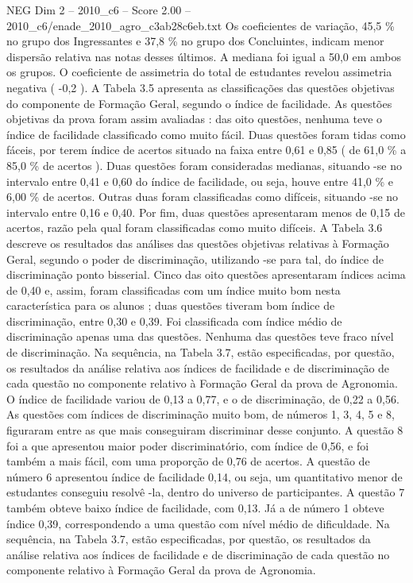 \begin{textsample}{NEG Dim 2 – 2010\_c6 – Score 2.00 – 2010\_c6/enade\_2010\_agro\_c3ab28c6eb.txt}
Os coeficientes de variação, 45,5 \% no grupo dos Ingressantes e 37,8 \% no grupo dos Concluintes, indicam menor dispersão relativa nas notas desses últimos.
A mediana foi igual a 50,0 em ambos os grupos.
O coeficiente de assimetria do total de estudantes revelou assimetria negativa ( -0,2 ).
A Tabela 3.5 apresenta as classificações das questões objetivas do componente de Formação Geral, segundo o índice de facilidade.
As questões objetivas da prova foram assim avaliadas : das oito questões, nenhuma teve o índice de facilidade classificado como muito fácil.
Duas questões foram tidas como fáceis, por terem índice de acertos situado na faixa entre 0,61 e 0,85 ( de 61,0 \% a 85,0 \% de acertos ).
Duas questões foram consideradas medianas, situando -se no intervalo entre 0,41 e 0,60 do índice de facilidade, ou seja, houve entre 41,0 \% e 6,00 \% de acertos.
Outras duas foram classificadas como difíceis, situando -se no intervalo entre 0,16 e 0,40.
Por fim, duas questões apresentaram menos de 0,15 de acertos, razão pela qual foram classificadas como muito difíceis.
A Tabela 3.6 descreve os resultados das análises das questões objetivas relativas à Formação Geral, segundo o poder de discriminação, utilizando -se para tal, do índice de discriminação ponto bisserial.
Cinco das oito questões apresentaram índices acima de 0,40 e, assim, foram classificadas com um índice muito bom nesta característica para os alunos ; duas questões tiveram bom índice de discriminação, entre 0,30 e 0,39.
Foi classificada com índice médio de discriminação apenas uma das questões.
Nenhuma das questões teve fraco nível de discriminação.
Na sequência, na Tabela 3.7, estão especificadas, por questão, os resultados da análise relativa aos índices de facilidade e de discriminação de cada questão no componente relativo à Formação Geral da prova de Agronomia.
O índice de facilidade variou de 0,13 a 0,77, e o de discriminação, de 0,22 a 0,56.
As questões com índices de discriminação muito bom, de números 1, 3, 4, 5 e 8, figuraram entre as que mais conseguiram discriminar desse conjunto.
A questão 8 foi a que apresentou maior poder discriminatório, com índice de 0,56, e foi também a mais fácil, com uma proporção de 0,76 de acertos.
A questão de número 6 apresentou índice de facilidade 0,14, ou seja, um quantitativo menor de estudantes conseguiu resolvê -la, dentro do universo de participantes.
A questão 7 também obteve baixo índice de facilidade, com 0,13.
Já a de número 1 obteve índice 0,39, correspondendo a uma questão com nível médio de dificuldade.
Na sequência, na Tabela 3.7, estão especificadas, por questão, os resultados da análise relativa aos índices de facilidade e de discriminação de cada questão no componente relativo à Formação Geral da prova de Agronomia.

\end{textsample}
